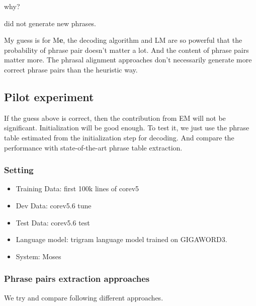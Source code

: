 \documentclass[11pt, letterpaper]{article}   	%
\begin{document}
\cite{marcu-wong-02} why?

\cite{denero-06-wmt} did not generate new phrases.

My guess is for M\textbf{e}, the decoding algorithm and LM are so powerful that the probability of phrase pair doesn't matter a lot. And the content of phrase pairs matter more. The phrasal alignment approaches don't necessarily generate more correct phrase pairs than the heuristic way.

\subsection{Pilot experiment}
If the guess above is correct, then the contribution from EM will not be significant. Initialization will be good enough. To test it, we just use the phrase table estimated from the initialization step for decoding. And compare the performance with state-of-the-art phrase table extraction. 

\subsubsection{Setting}
\begin{itemize}
\item Training Data: first 100k lines of corev5
\item Dev Data: corev5.6 tune
\item Test Data: corev5.6 test
\item Language model: trigram language model trained on GIGAWORD3.
\item System: Moses \cite{moses-07}
\end{itemize}

\subsubsection{Phrase pairs extraction approaches}
We try and compare following different approaches.
\end{document}
